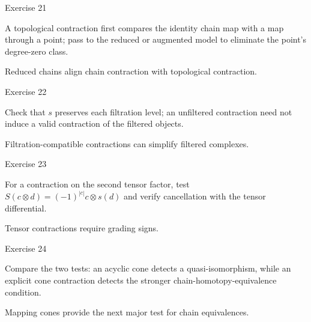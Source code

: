 \begin{exercise}\label{exr:viii23-21}
Exercise 21
\end{exercise}
\begin{hint}
A topological contraction first compares the identity chain map with a map through a point; pass to the reduced or augmented model to eliminate the point's degree-zero class.
\end{hint}
\begin{solution}
Reduced chains align chain contraction with topological contraction.
\end{solution}

\begin{exercise}\label{exr:viii23-22}
Exercise 22
\end{exercise}
\begin{hint}
Check that \(s\) preserves each filtration level; an unfiltered contraction need not induce a valid contraction of the filtered objects.
\end{hint}
\begin{solution}
Filtration-compatible contractions can simplify filtered complexes.
\end{solution}

\begin{exercise}\label{exr:viii23-23}
Exercise 23
\end{exercise}
\begin{hint}
For a contraction on the second tensor factor, test \(S(c\otimes d)=(-1)^{|c|}c\otimes s(d)\) and verify cancellation with the tensor differential.
\end{hint}
\begin{solution}
Tensor contractions require grading signs.
\end{solution}

\begin{exercise}\label{exr:viii23-24}
Exercise 24
\end{exercise}
\begin{hint}
Compare the two tests: an acyclic cone detects a quasi-isomorphism, while an explicit cone contraction detects the stronger chain-homotopy-equivalence condition.
\end{hint}
\begin{solution}
Mapping cones provide the next major test for chain equivalences.
\end{solution}


